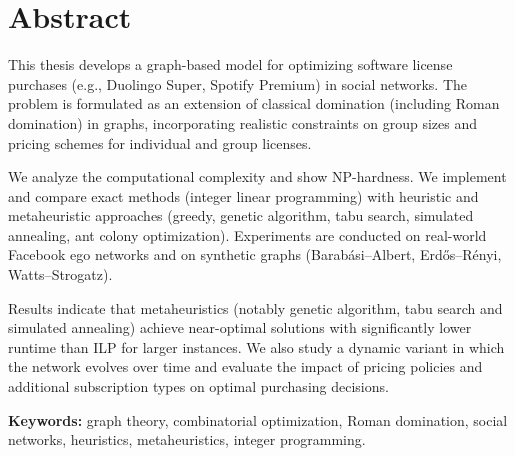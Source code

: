 \section*{Abstract}

This thesis develops a graph-based model for optimizing software license purchases (e.g., Duolingo Super, Spotify Premium) in social networks. The problem is formulated as an extension of classical domination (including Roman domination) in graphs, incorporating realistic constraints on group sizes and pricing schemes for individual and group licenses.

We analyze the computational complexity and show NP-hardness. We implement and compare exact methods (integer linear programming) with heuristic and metaheuristic approaches (greedy, genetic algorithm, tabu search, simulated annealing, ant colony optimization). Experiments are conducted on real-world Facebook ego networks and on synthetic graphs (Barabási–Albert, Erdős–Rényi, Watts–Strogatz).

Results indicate that metaheuristics (notably genetic algorithm, tabu search and simulated annealing) achieve near-optimal solutions with significantly lower runtime than ILP for larger instances. We also study a dynamic variant in which the network evolves over time and evaluate the impact of pricing policies and additional subscription types on optimal purchasing decisions.

\textbf{Keywords:} graph theory, combinatorial optimization, Roman domination, social networks, heuristics, metaheuristics, integer programming.
